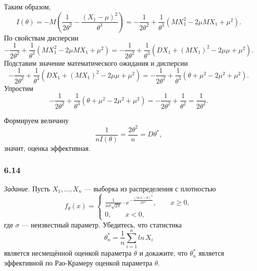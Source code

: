 Таким образом,
$$I \left( \theta \right) =
  -M \left( \frac{1}{2 \theta^2} - \frac{ \left( X_1 - \mu \right)^2}{ \theta^3} \right) =
  - \frac{1}{2 \theta^2} + \frac{1}{ \theta^3} \left( MX_1^2 - 2 \mu MX_1 + \mu^2 \right).$$
По свойствам дисперсии
$$- \frac{1}{2 \theta^2} + \frac{1}{ \theta^3} \left( MX_1^2 - 2 \mu MX_1 + \mu^2 \right) =
  - \frac{1}{2 \theta^2} +
  \frac{1}{ \theta^3} \left( DX_1 + \left( MX_1 \right)^2 - 2 \mu \mu + \mu^2 \right).$$
Подставим значение математического ожидания и дисперсии
$$- \frac{1}{2 \theta^2} +
  \frac{1}{ \theta^3} \left( DX_1 + \left( MX_1 \right)^2 - 2 \mu \mu + \mu^2 \right) =
  - \frac{1}{2 \theta^2} + \frac{1}{ \theta^3} \left( \theta + \mu^2 - 2 \mu^2 + \mu^2 \right).$$
Упростим
$$- \frac{1}{2 \theta^2} + \frac{1}{ \theta^3} \left( \theta + \mu^2 - 2 \mu^2 + \mu^2 \right) =
  - \frac{1}{2 \theta^2} + \frac{1}{ \theta^2} =
  \frac{1}{2 \theta^2}.$$

Формируем величину
$$ \frac{1}{nI \left( \theta \right) } =
  \frac{2 \theta^2}{n} =
  D \theta^*,$$
значит, оценка эффективная.

\subsubsection*{6.14}

\textit{Задание.} Пусть $X_1, \dotsc, X_n$ --- выборка из распределения с плотностью
$$f_{ \theta } \left( x \right) =
  \begin{cases}
    \frac{1}{x \sigma \sqrt{2 \pi }} \cdot
    e^{- \frac{ \left( ln \, x - \theta \right)^2}{2 \sigma^2}}, \qquad x \geq 0, \\
    0, \qquad x < 0,
  \end{cases}$$
где $ \sigma $ --- неизвестный параметр.
Убедитесь, что статистика
$$ \theta_n^* =
  \frac{1}{n} \sum \limits_{i = 1}^n ln \, X_i$$
является несмещённой оценкой параметра $ \theta $ и докажите,
что $ \theta_n^*$ является эффективной по Рао-Крамеру оценкой параметра $ \theta $.

